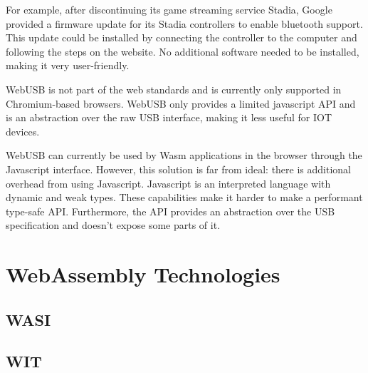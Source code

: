 For example, after discontinuing its game streaming service Stadia, Google provided a firmware update for its Stadia controllers to enable bluetooth support. This update could be installed by connecting the controller to the computer and following the steps on the website. No additional software needed to be installed, making it very user-friendly.

WebUSB is not part of the web standards and is currently only supported in Chromium-based browsers. WebUSB only provides a limited javascript API and is an abstraction over the raw USB interface, making it less useful for IOT devices.

WebUSB can currently be used by Wasm applications in the browser through the Javascript interface. However, this solution is far from ideal: there is additional overhead from using Javascript. Javascript is an interpreted language with dynamic and weak types. These capabilities make it harder to make a performant type-safe API. Furthermore, the API provides an abstraction over the USB specification and doesn't expose some parts of it.

\section{WebAssembly Technologies}

\subsection{WASI}

\subsection{WIT}